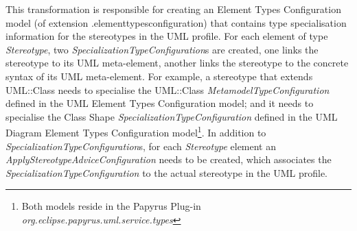 This transformation is responsible for creating an Element Types Configuration model (of extension .elementtypesconfiguration) that contains type specialisation information for the stereotypes in the UML profile. 
For each element of type \textit{Stereotype}, two \textit{SpecializationTypeConfiguration}s are created, one links the stereotype to its UML meta-element, another links the stereotype to the concrete syntax of its UML meta-element.
For example, a stereotype that extends UML::Class needs to specialise the UML::Class \textit{MetamodelTypeConfiguration} defined in the UML Element Types Configuration model; and it needs to specialise the Class Shape \textit{SpecializationTypeConfiguration} defined in the UML Diagram Element Types Configuration model\footnote{Both models reside in the Papyrus Plug-in \textit{org.eclipse.papyrus.uml.service.types}}. 
In addition to \textit{SpecializationTypeConfiguration}s, for each \textit{Stereotype} element an \textit{ApplyStereotypeAdviceConfiguration} needs to be created, which associates the \textit{SpecializationTypeConfiguration} to the actual stereotype in the UML profile.


